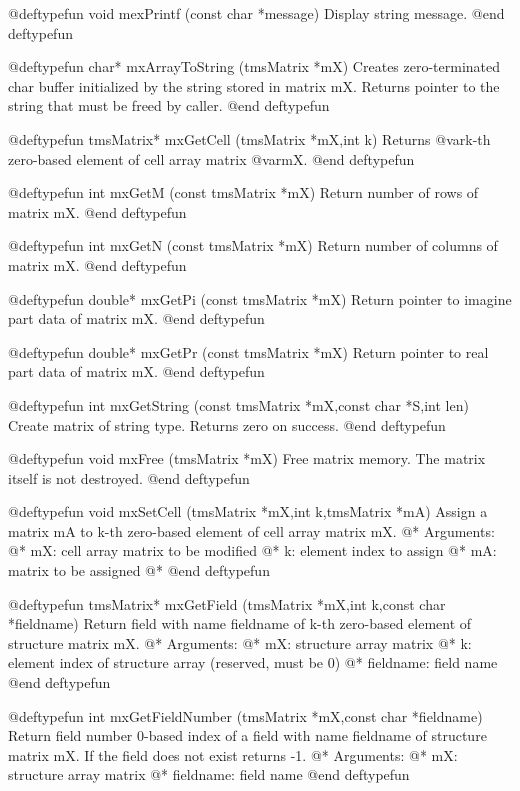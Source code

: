 @deftypefun   void mexPrintf (const char *message)
Display string message.
@end deftypefun

@deftypefun    char* mxArrayToString (tmsMatrix *mX)  
Creates zero-terminated char buffer initialized by the string stored in
matrix mX.
Returns pointer to the string that must be freed by caller. 
@end deftypefun


@deftypefun             tmsMatrix* mxGetCell (tmsMatrix *mX,int k)  
Returns @var{k}-th zero-based element of cell array matrix @var{mX}. 
@end deftypefun
	

@deftypefun          int mxGetM (const tmsMatrix *mX) 
Return number of rows of matrix mX.
@end deftypefun
  


@deftypefun          int mxGetN (const tmsMatrix *mX) 
Return number of columns of matrix mX.
@end deftypefun


@deftypefun          double* mxGetPi (const tmsMatrix *mX) 
Return pointer to imagine part data of matrix mX.
@end deftypefun


@deftypefun          double* mxGetPr (const tmsMatrix *mX) 
Return pointer to real part data of matrix mX.
@end deftypefun




@deftypefun         int mxGetString (const tmsMatrix *mX,const char *S,int len) 
Create matrix of string type. Returns zero on success.
@end deftypefun


@deftypefun       void    mxFree (tmsMatrix *mX) 
Free matrix memory. The matrix itself is not destroyed.
@end deftypefun


@deftypefun       void  mxSetCell (tmsMatrix *mX,int k,tmsMatrix *mA) 
Assign a matrix mA to k-th zero-based element of cell array matrix mX. @*
Arguments: @*
	mX: cell array matrix to be modified @*
	k: element index to assign @*
	mA: matrix to be assigned @*
@end deftypefun	



@deftypefun         tmsMatrix* mxGetField (tmsMatrix *mX,int k,const char *fieldname) 
Return field with name fieldname of k-th zero-based element of structure matrix mX. @*
Arguments: @*
	mX: structure array matrix @*
	k: element index of structure array (reserved, must be 0) @*
	fieldname: field name
@end deftypefun



@deftypefun         int mxGetFieldNumber (tmsMatrix *mX,const char *fieldname) 
Return field number 0-based index of a field with name fieldname  of structure matrix mX. If the field does not exist returns -1. @*
Arguments: @*
	mX: structure array matrix @*
	fieldname: field name
@end deftypefun	



